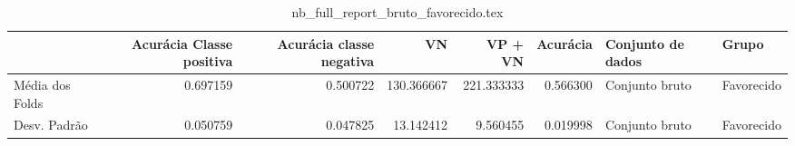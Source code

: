 \begin{table}
\centering
\caption{nb_full_report_bruto_favorecido.tex}
\label{nb_full_report_bruto_favorecido.tex}
\begin{tabular}{lrrrrrll}
\toprule
{}              &  Acurácia Classe positiva &  Acurácia classe negativa &         VN  &    VP + VN  &  Acurácia & Conjunto de dados &       Grupo \\
\midrule
Média dos Folds &                  0.697159 &                  0.500722 &  130.366667 &  221.333333 &  0.566300 &    Conjunto bruto &  Favorecido \\
Desv. Padrão    &                  0.050759 &                  0.047825 &   13.142412 &    9.560455 &  0.019998 &    Conjunto bruto &  Favorecido \\
\bottomrule
\end{tabular}
\end{table}
